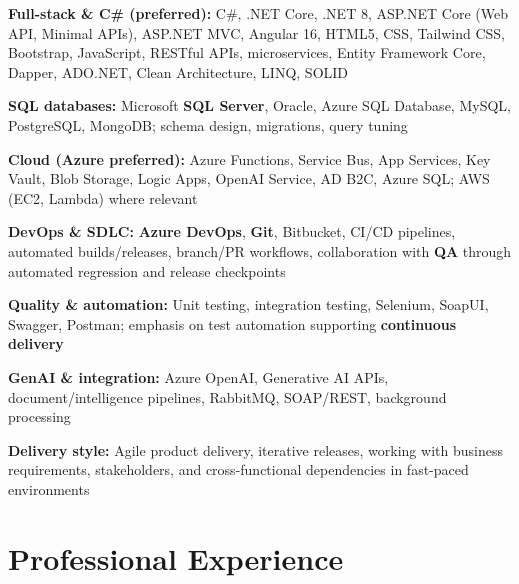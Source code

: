 \documentclass[letterpaper,10pt]{article}
\newenvironment{resume_list}{
  \vspace{-7pt}
  \begin{itemize}[itemsep=-2px, parsep=1pt, leftmargin=30pt]
}{
  \end{itemize}
}
\begin{document}
\begin{resume_list}
    \item \textbf{Full-stack \& C\# (preferred):} C\#, .NET Core, .NET 8, ASP.NET Core (Web API, Minimal APIs), ASP.NET MVC, Angular 16, HTML5, CSS, Tailwind CSS, Bootstrap, JavaScript, RESTful APIs, microservices, Entity Framework Core, Dapper, ADO.NET, Clean Architecture, LINQ, SOLID
    \item \textbf{SQL databases:} Microsoft \textbf{SQL Server}, Oracle, Azure SQL Database, MySQL, PostgreSQL, MongoDB; schema design, migrations, query tuning
    \item \textbf{Cloud (Azure preferred):} Azure Functions, Service Bus, App Services, Key Vault, Blob Storage, Logic Apps, OpenAI Service, AD B2C, Azure SQL; AWS (EC2, Lambda) where relevant
    \item \textbf{DevOps \& SDLC:} \textbf{Azure DevOps}, \textbf{Git}, Bitbucket, CI/CD pipelines, automated builds/releases, branch/PR workflows, collaboration with \textbf{QA} through automated regression and release checkpoints
    \item \textbf{Quality \& automation:} Unit testing, integration testing, Selenium, SoapUI, Swagger, Postman; emphasis on test automation supporting \textbf{continuous delivery}
    \item \textbf{GenAI \& integration:} Azure OpenAI, Generative AI APIs, document/intelligence pipelines, RabbitMQ, SOAP/REST, background processing
    \item \textbf{Delivery style:} Agile product delivery, iterative releases, working with business requirements, stakeholders, and cross-functional dependencies in fast-paced environments
\end{resume_list}

\section{Professional Experience}
\end{document}
